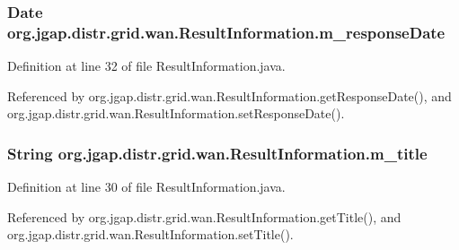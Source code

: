 \hypertarget{classorg_1_1jgap_1_1distr_1_1grid_1_1wan_1_1_result_information_a2462d1cc67b53f6fb91870115857cc6b}{
\subsubsection[{m\-\_\-response\-Date}]{\setlength{\rightskip}{0pt plus 5cm}Date org.\-jgap.\-distr.\-grid.\-wan.\-Result\-Information.\-m\-\_\-response\-Date\hspace{0.3cm}{\ttfamily [private]}}}\label{classorg_1_1jgap_1_1distr_1_1grid_1_1wan_1_1_result_information_a2462d1cc67b53f6fb91870115857cc6b}


Definition at line 32 of file Result\-Information.\-java.



Referenced by org.\-jgap.\-distr.\-grid.\-wan.\-Result\-Information.\-get\-Response\-Date(), and org.\-jgap.\-distr.\-grid.\-wan.\-Result\-Information.\-set\-Response\-Date().

\hypertarget{classorg_1_1jgap_1_1distr_1_1grid_1_1wan_1_1_result_information_a55655c6d928baf5ba9366c716befbf02}{
\subsubsection[{m\-\_\-title}]{\setlength{\rightskip}{0pt plus 5cm}String org.\-jgap.\-distr.\-grid.\-wan.\-Result\-Information.\-m\-\_\-title\hspace{0.3cm}{\ttfamily [private]}}}\label{classorg_1_1jgap_1_1distr_1_1grid_1_1wan_1_1_result_information_a55655c6d928baf5ba9366c716befbf02}


Definition at line 30 of file Result\-Information.\-java.



Referenced by org.\-jgap.\-distr.\-grid.\-wan.\-Result\-Information.\-get\-Title(), and org.\-jgap.\-distr.\-grid.\-wan.\-Result\-Information.\-set\-Title().

